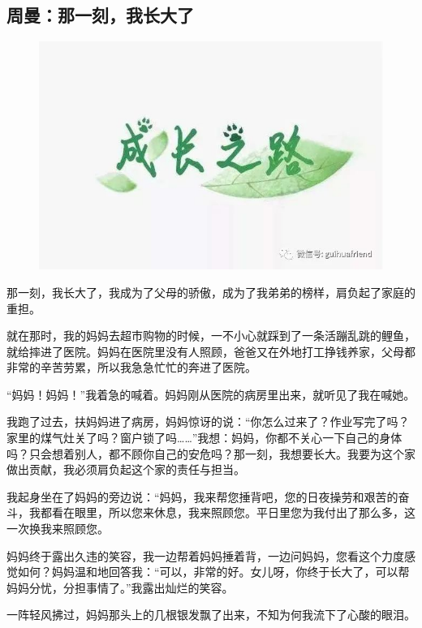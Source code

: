 \vspace{10pt}

{\centering\subsection*{周曼：那一刻，我长大了}}


\renewcommand{\leftmark}{周曼：那一刻，我长大了}

\begin{figure}[htbp]

\centering

\includegraphics[width = .5\textwidth]{./ch/38.jpg}

\end{figure}



那一刻，我长大了，我成为了父母的骄傲，成为了我弟弟的榜样，肩负起了家庭的重担。

就在那时，我的妈妈去超市购物的时候，一不小心就踩到了一条活蹦乱跳的鲤鱼，就给摔进了医院。妈妈在医院里没有人照顾，爸爸又在外地打工挣钱养家，父母都非常的辛苦劳累，所以我急急忙忙的奔进了医院。

“妈妈！妈妈！”我着急的喊着。妈妈刚从医院的病房里出来，就听见了我在喊她。

我跑了过去，扶妈妈进了病房，妈妈惊讶的说：“你怎么过来了？作业写完了吗？家里的煤气灶关了吗？窗户锁了吗……”我想：妈妈，你都不关心一下自己的身体吗？只会想着别人，都不顾你自己的安危吗？那一刻，我想要长大。我要为这个家做出贡献，我必须肩负起这个家的责任与担当。

我起身坐在了妈妈的旁边说：“妈妈，我来帮您捶背吧，您的日夜操劳和艰苦的奋斗，我都看在眼里，所以您来休息，我来照顾您。平日里您为我付出了那么多，这一次换我来照顾您。

妈妈终于露出久违的笑容，我一边帮着妈妈捶着背，一边问妈妈，您看这个力度感觉如何？妈妈温和地回答我：“可以，非常的好。女儿呀，你终于长大了，可以帮妈妈分忧，分担事情了。”我露出灿烂的笑容。

一阵轻风拂过，妈妈那头上的几根银发飘了出来，不知为何我流下了心酸的眼泪。





